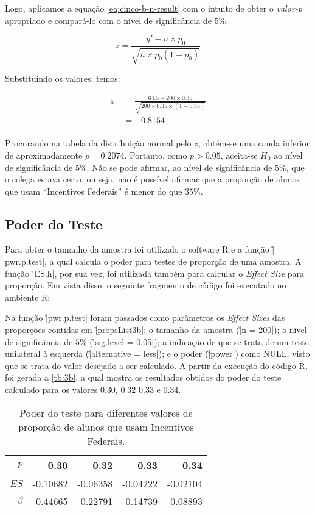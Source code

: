 Logo, aplicamos a equação \ref{eq:cinco-b-n-result} com o intuito de obter o \textit{valor-p} 
apropriado e compará-lo com o nível de significância de $5\%$.

\begin{equation}
  \label{eq:cinco-b-n-result}
  z = \frac{y' - n \times p_0}{ \sqrt{n \times p_0 (1 - p_0)} }
\end{equation}

Substituindo os valores, temos:

\begin{align*}
  z &\;= \frac{64.5 - 200 \times 0.35}{ \sqrt{200 \times 0.35 \times (1 - 0.35)} } \\
    &\;= - 0.8154 \nonumber \\
\end{align*}

Procurando na tabela da distribuição normal pelo $z$, 
obtém-se uma cauda inferior de aproximadamente $p = 0.2074$.
Portanto, como $p > 0.05$, aceita-se $H_0$ ao nível de significância de 5\%. 
Não se pode afirmar, ao nível de significância de $5\%$, que o colega estava certo, ou seja, 
não é possível afirmar que a proporção de  alunos que usam ``Incentivos Federais'' é menor do que $35\%$.


\subsection{Poder do Teste}
\label{questao:3b}

Para obter o tamanho da amostra foi utilizado o software R e a função \r|pwr.p.test|, a qual calcula o poder para testes de proporção de uma amostra.
A função \r|ES.h|, por sua vez, foi utilizada também para calcular o \textit{Effect Size} para proporção.
Em vista disso, o seguinte fragmento de código foi executado no ambiente R:


Na função \r|pwr.p.test| foram passados como parâmetros os \textit{Effect Sizes} das proporções contidas em \r|propsList3b|;
o tamanho da amostra (\r|n = 200|); 
o nível de significância de $5\%$ (\r|sig.level = 0.05|);
a indicação de que se trata de um teste unilateral à esquerda (\r|alternative = less|); 
e o poder (\r|power|) como NULL, visto que se trata do valor desejado a ser calculado.
A partir da execução do código R, foi gerada a \autoref{tb:3b}, a qual mostra os resultados obtidos do poder do teste calculado para os valores $0.30$, $0.32$ $0.33$ e $0.34$.

\begin{table}[ht]
\centering
\caption{Poder do teste para diferentes valores de proporção de alunos que usam Incentivos Federais.} 
\label{tb:3b}
\begin{tabular}{rrrrr}
  \toprule
 $p$ & 0.30 & 0.32 & 0.33 & 0.34 \\ 
  \midrule
$ES$ 	& -0.10682 & -0.06358 & -0.04222 & -0.02104 \\ 
$\beta$ & 0.44665   & 0.22791   & 0.14739   & 0.08893  \\ 
   \bottomrule
\end{tabular}
\end{table}

